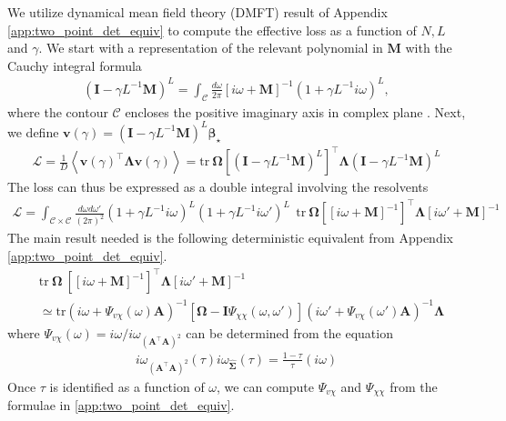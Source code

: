 \documentclass{article} %
\def\v{\bm v}
\begin{document}
We utilize dynamical mean field theory (DMFT) result of Appendix \ref{app:two_point_det_equiv} to compute the effective loss as a function of $N,L$ and $\gamma$. We start with a representation of the relevant polynomial in $\bm M$ with the Cauchy integral formula 
\begin{align}
    \left( \bm I - \gamma L^{-1} \bm M \right)^{L}  = \int_{\mathcal C} \frac{d\omega }{2\pi} \left[ i\omega + \bm M \right]^{-1} \left( 1 + \gamma L^{-1} i \omega \right)^{L} ,
\end{align}
where the contour $\mathcal C$ encloses the positive imaginary axis in complex plane \citep{bender2013advanced}.  Next, we define $\v(\gamma) = \left( \bm I - \gamma L^{-1} \bm M \right)^{L} \bm\beta_\star$ 
\begin{align}
    \mathcal L = \frac{1}{D} \left< \v(\gamma)^\top \bm\Lambda \v(\gamma)  \right> = \text{tr} \  \bm\Omega \left[  \left( \bm I - \gamma L^{-1} \bm M \right)^{L} \right]^\top \bm \Lambda \left( \bm I - \gamma L^{-1} \bm M \right)^{L}    
\end{align}
The loss can thus be expressed as a double integral involving the resolvents 
\begin{align}
    \mathcal L = \int_{\mathcal C \times\mathcal C} \frac{d \omega d\omega' }{(2\pi )^2} ( 1 + \gamma L^{-1} i\omega)^L (1 + \gamma L^{-1} i\omega')^L \ \ \text{tr}  \ \bm\Omega \left[ \left[ i\omega + \bm M \right]^{-1}\right]^\top \bm \Lambda \left[i\omega' + \bm M \right]^{-1} 
\end{align}
The main result needed is the following deterministic equivalent from Appendix \ref{app:two_point_det_equiv}.
\begin{align}
    &\text{tr} \ \bm\Omega \  \left[ \left[ i\omega + \bm M \right]^{-1}\right]^\top \bm\Lambda \left[i\omega' + \bm M \right]^{-1}  \nonumber
    \\
    &\simeq \text{tr}  \left( i \omega + \Psi_{v\chi}(\omega) \bm A \right)^{-1} \left[ \bm\Omega  - \bm I \Psi_{\chi\chi}(\omega,\omega') \right]  \left( i \omega' + \Psi_{v\chi}(\omega') \bm A \right)^{-1} \bm\Lambda
\end{align}
where $\Psi_{v\chi}(\omega) = i\omega / i\omega_{(\bm A^\top \bm A)^2}$ can be determined from the equation
\begin{align}
    i\omega_{(\bm A^\top \bm A)^2}(\tau) i\omega_{\hat{\bm\Sigma}}(\tau) = \frac{1-\tau}{\tau} ( i \omega )
\end{align}
Once $\tau$ is identified as a function of $\omega$, we can compute $\Psi_{v\chi}$ and $\Psi_{\chi\chi}$ from the formulae in \ref{app:two_point_det_equiv}. 
\end{document}
